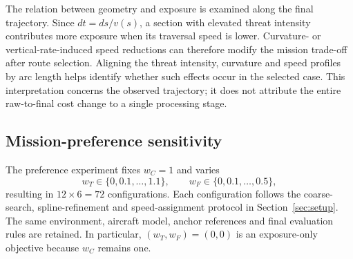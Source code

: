 The relation between geometry and exposure is examined along the final
trajectory. Since $dt=ds/v(s)$, a section with elevated threat intensity
contributes more exposure when its traversal speed is lower. Curvature-
or vertical-rate-induced speed reductions can therefore modify the
mission trade-off after route selection. Aligning the threat intensity,
curvature and speed profiles by arc length helps identify whether such
effects occur in the selected case. This interpretation concerns the
observed trajectory; it does not attribute the entire raw-to-final cost
change to a single processing stage.


\subsection{Mission-preference sensitivity}
\label{sec:sensitivity}

The preference experiment fixes $w_C=1$ and varies
\begin{equation}
 w_T\in\{0,0.1,\ldots,1.1\},\qquad
 w_F\in\{0,0.1,\ldots,0.5\},
 \label{ex:eq:weights}
\end{equation}
resulting in $12\times6=72$ configurations. Each configuration follows
the coarse-search, spline-refinement and speed-assignment protocol in
Section~\ref{sec:setup}. The same environment, aircraft model, anchor
references and final evaluation rules are retained. In particular,
$(w_T,w_F)=(0,0)$ is an exposure-only objective because $w_C$ remains one.

